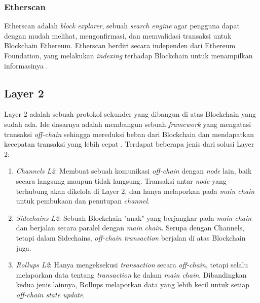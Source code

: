 \subsubsection{Etherscan}
\label{subsubsec:etherscan}

Etherscan adalah \textit{block explorer}, sebuah \textit{search engine} agar pengguna dapat dengan mudah melihat, mengonfirmasi, dan memvalidasi transaksi untuk Blockchain Ethereum. Etherscan berdiri secara independen dari Ethereum Foundation, yang melakukan \textit{indexing} terhadap Blockchain untuk menampilkan informasinya \parencite{etherscan2024}.

\subsection{Layer 2}
\label{subsec:layer-2}

Layer 2 adalah sebuah protokol sekunder yang dibangun di atas Blockchain yang sudah ada. Ide dasarnya adalah membangun sebuah \textit{framework} yang mengatasi transaksi \textit{off-chain} sehingga mereduksi beban dari Blockchain dan mendapatkan kecepatan transaksi yang lebih cepat \parencite{sguanci2021layer}. Terdapat beberapa jenis dari solusi Layer 2:

\begin{enumerate}
	\item \textit{Channels L2}: Membuat sebuah komunikasi \textit{off-chain} dengan \textit{node} lain, baik secara langsung maupun tidak langsung. Transaksi antar \textit{node} yang terhubung akan dikelola di Layer 2, dan hanya melaporkan pada \textit{main chain} untuk pembukaan dan penutupan \textit{channel}.
	\item \textit{Sidechains L2}: Sebuah Blockchain "anak" yang berjangkar pada \textit{main chain} dan berjalan secara paralel dengan \textit{main chain}. Serupa dengan Channels, tetapi dalam Sidechains, \textit{off-chain transaction} berjalan di atas Blockchain juga.
	\item \textit{Rollups L2}: Hanya mengeksekusi \textit{transaction} secara \textit{off-chain}, tetapi selalu melaporkan data tentang \textit{transaction} ke dalam \textit{main chain}. Dibandingkan kedua jenis lainnya, Rollups melaporkan data yang lebih kecil untuk setiap \textit{off-chain state update}.
\end{enumerate}

\newpage